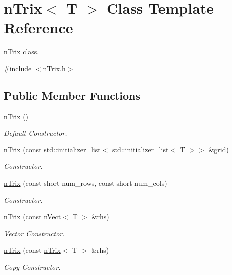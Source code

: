 \hypertarget{classnTrix}{}\section{n\+Trix$<$ T $>$ Class Template Reference}
\label{classnTrix}


\hyperlink{classnTrix}{n\+Trix} class.  




{\ttfamily \#include $<$n\+Trix.\+h$>$}

\subsection*{Public Member Functions}
\begin{DoxyCompactItemize}
\item 
\hyperlink{classnTrix_a1f99b7fa79bb2f28ffd014591c55d3a1}{n\+Trix} ()
\begin{DoxyCompactList}\small\item\em Default Constructor. \end{DoxyCompactList}\item 
\hyperlink{classnTrix_ad7dd393c0056a77c9ebeb551112e2f7c}{n\+Trix} (const std\+::initializer\+\_\+list$<$ std\+::initializer\+\_\+list$<$ T $>$$>$ \&grid)
\begin{DoxyCompactList}\small\item\em Constructor. \end{DoxyCompactList}\item 
\hyperlink{classnTrix_ac0b8db0c386024c87d57b8c0e3a31c65}{n\+Trix} (const short num\+\_\+rows, const short num\+\_\+cols)
\begin{DoxyCompactList}\small\item\em Constructor. \end{DoxyCompactList}\item 
\hyperlink{classnTrix_a702b976039784b4b6d699c929f835270}{n\+Trix} (const \hyperlink{classnVect}{n\+Vect}$<$ T $>$ \&rhs)
\begin{DoxyCompactList}\small\item\em Vector Constructor. \end{DoxyCompactList}\item 
\hyperlink{classnTrix_a490ebc8fb7a94e577b33e05b16daafec}{n\+Trix} (const \hyperlink{classnTrix}{n\+Trix}$<$ T $>$ \&rhs)
\begin{DoxyCompactList}\small\item\em Copy Constructor. \end{DoxyCompactList}\item 
$$
\end{DoxyCompactItemize}
